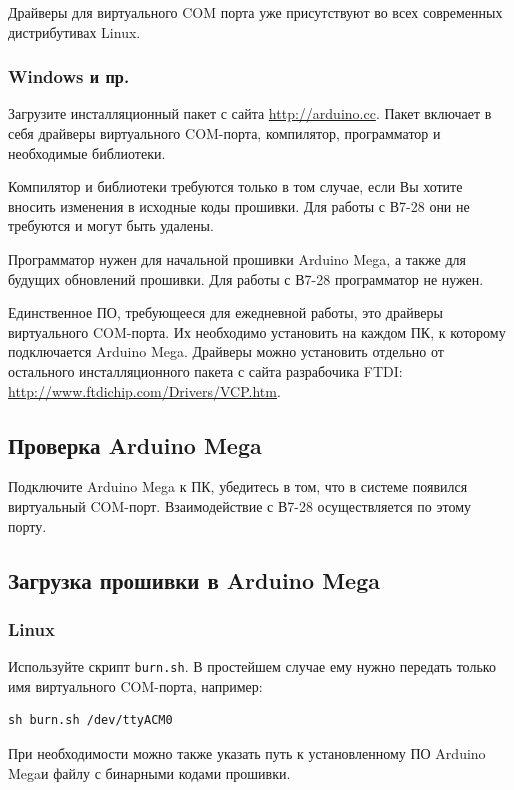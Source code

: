 \documentclass[12pt, a4paper]{article}
\newcommand{\V}{\mbox{В7-28}}
\newcommand{\Arduino}{Arduino Mega}
\begin{document}
Драйверы для виртуального COM порта уже присутствуют во всех современных дистрибутивах Linux.

\subsubsection{Windows и пр.}

Загрузите инсталляционный пакет с сайта \url{http://arduino.cc}. Пакет включает в себя драйверы виртуального COM-порта, компилятор, программатор и необходимые библиотеки.

Компилятор и библиотеки требуются только в том случае, если Вы хотите вносить изменения в исходные коды прошивки. Для работы с \V{} они не требуются и могут быть удалены.

Программатор нужен для начальной прошивки \Arduino, а также для будущих обновлений прошивки. Для работы с \V{} программатор не нужен.

Единственное ПО, требующееся для ежедневной работы, это драйверы виртуального COM-порта. Их необходимо установить на каждом ПК, к которому подключается \Arduino. Драйверы можно установить отдельно от остального инсталляционного пакета с сайта разрабочика FTDI: \url{http://www.ftdichip.com/Drivers/VCP.htm}.

\subsection{Проверка \Arduino}

Подключите \Arduino{} к ПК, убедитесь в том, что в системе появился виртуальный COM-порт. Взаимодействие с \V{} осуществляется по этому порту.

\subsection{Загрузка прошивки в \Arduino}

\subsubsection{Linux}

Используйте скрипт {\tt burn.sh}. В простейшем случае ему нужно передать только имя виртуального COM-порта, например:

\begin{verbatim}
sh burn.sh /dev/ttyACM0
\end{verbatim}

При необходимости можно также указать путь к установленному ПО \Arduino и файлу с бинарными кодами прошивки.
\end{document}
